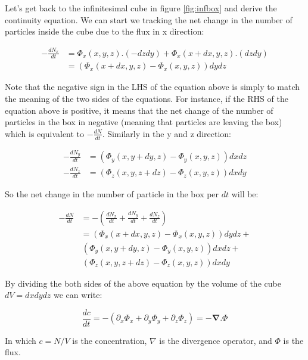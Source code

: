 



\newpage

Let's get back to the infinitesimal cube in figure \ref{fig:infbox} and derive the continuity equation. We can start we tracking the net change in the number of particles inside the cube due to the flux in x direction:

\begin{align*}
	-\frac{dN_x}{dt} &= \Phi_x(x,y,z) . (-dz dy) + \Phi_x(x +dx, y,z) . (dzdy) \\
	 				&= (\Phi_x(x+dx,y,z)-\Phi_x(x,y,z))dydz 
\end{align*}

Note that the negative sign in the LHS of the equation above is simply to match the meaning of the two sides of the equations. For instance, if the RHS of the equation above is positive, it means that the net change of the number of particles in the box in negative (meaning that particles are leaving the box) which is equivalent to $ -\frac{dN}{dt} $. Similarly in the y and z direction:

\begin{align*}
	-\frac{dN_y}{dt} &= (\Phi_y(x,y+dy,z)-\Phi_y(x,y,z)) dx dz \\
	-\frac{dN_z}{dt} &= (\Phi_z(x,y,z+dz) - \Phi_z(x,y,z)) dx dy
\end{align*}

So the net change in the number of particle in the box per $dt$ will be:

\begin{align*}
	-\frac{dN}{dt} &= - (\frac{dN_x}{dt} + \frac{dN_y}{dt} + \frac{dN_z}{dt}) \\
	&= (\Phi_x(x+dx,y,z)-\Phi_x(x,y,z))dydz + \\
	&\, (\Phi_y(x,y+dy,z)-\Phi_y(x,y,z)) dx dz + \\
	&\, (\Phi_z(x,y,z+dz) - \Phi_z(x,y,z)) dx dy
\end{align*}


By dividing the both sides of the above equation by the volume of the cube $ dV = dx dy dz $ we can write:

\begin{equation*}
	\frac{dc}{dt} = - (\partial_{x}\Phi_x + \partial_{y}\Phi_y + \partial_{z}\Phi_z) = -\mathbf{\nabla} . \Phi
\end{equation*}

In which $c = N/V$ is the concentration, $ \nabla $ is the divergence operator, and $ \Phi $ is the flux. 

